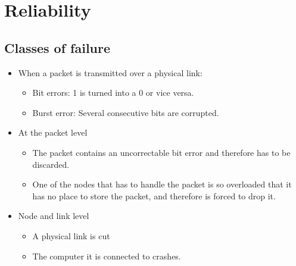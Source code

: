 \section{Reliability}

	\subsection{Classes of failure} 
	
		\begin{itemize}
			\item When a packet is transmitted over a physical link:
				\begin{itemize}
					\item Bit errors: 1 is turned into a 0 or vice versa.
					\item Burst error: Several consecutive bits are corrupted. 
				\end{itemize}
			\item At the packet level
				\begin{itemize}
                	\item The packet contains an uncorrectable bit error and
                	therefore has to be discarded.
                	\item One of the nodes that has to handle the packet is so
                	overloaded that it has no place to store the packet, and
                	therefore is forced to drop it.
				\end{itemize}
			\item Node and link level
				\begin{itemize}
					\item A physical link is cut
					\item The computer it is connected to crashes. 
						\cite[pp. 18-19]{PetersonDavie:2003}
				\end{itemize}
		\end{itemize}

